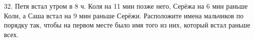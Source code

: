 32. Петя встал утром в 8 ч. Коля на 11 мин позже него, Серёжа на 6 мин раньше Коли, а Саша встал на 9 мин раньше Серёжи. Расположите имена мальчиков по порядку так, чтобы на первом месте было имя того из них, который встал раньше всех.\\

